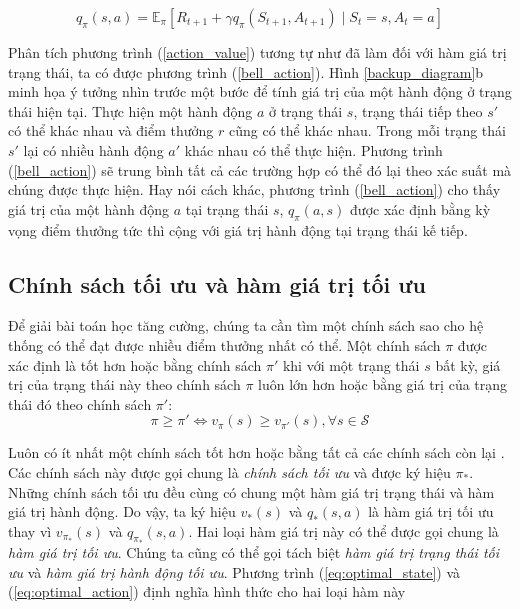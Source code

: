 \begin{equation}
\label{bell_action}
q_{\pi}(s,a) = \mathbb{E}_{\pi} \left[\mathit{R}_{t+1} + \gamma q_{\pi}(\mathit{S}_{t+1}, \mathit{A}_{t+1}) \mid \mathit{S}_t = s, \mathit{A}_t = a \right]
\end{equation}

Phân tích phương trình (\ref{action_value}) tương tự như đã làm đối với hàm giá trị trạng thái, ta có được phương trình (\ref{bell_action}).
Hình \ref{backup_diagram}b minh họa ý tưởng nhìn trước một bước để tính giá trị của một hành động ở trạng thái hiện tại. 
Thực hiện một hành động $a$ ở trạng thái $s$, trạng thái tiếp theo $s'$ có thể khác nhau và điểm thưởng $r$ cũng có thể khác nhau. 
Trong mỗi trạng thái $s'$ lại có nhiều hành động $a'$ khác nhau có thể thực hiện. 
Phương trình (\ref{bell_action}) sẽ trung bình tất cả các trường hợp có thể đó lại theo xác suất mà chúng được thực hiện. 
Hay nói cách khác, phương trình (\ref{bell_action}) cho thấy giá trị của một hành động $a$ tại trạng thái $s$, $q_{\pi}(a,s)$ được xác định bằng kỳ vọng điểm thưởng tức thì cộng với giá trị hành động tại trạng thái kế tiếp.

\subsection{Chính sách tối ưu và hàm giá trị tối ưu}
Để giải bài toán học tăng cường, chúng ta cần tìm một chính sách sao cho hệ thống có thể đạt được nhiều điểm thưởng nhất có thể. 
Một chính sách $\pi$ được xác định là tốt hơn hoặc bằng chính sách $\pi'$ khi với một trạng thái $s$ bất kỳ, giá trị của trạng thái này theo chính sách $\pi$ luôn lớn hơn hoặc bằng giá trị của trạng thái đó theo chính sách $\pi'$:
\begin{equation}
\pi \geq \pi' \Longleftrightarrow v_{\pi}(s) \geq v_{\pi'}(s), \forall s \in \mathcal{S}
\end{equation}

Luôn có ít nhất một chính sách tốt hơn hoặc bằng tất cả các chính sách còn lại \cite{sutton1998introduction}. 
Các chính sách này được gọi chung là \textit{chính sách tối ưu} và được ký hiệu $\pi_{*}$. 
Những chính sách tối ưu đều cùng có chung một hàm giá trị trạng thái và hàm giá trị hành động.
Do vậy, ta ký hiệu $v_{*}(s)$ và $q_{*}(s,a)$ là hàm giá trị tối ưu thay vì $v_{\pi_{*}}(s)$ và $q_{\pi_{*}}(s, a)$.
Hai loại hàm giá trị này có thể được gọi chung là \textit{hàm giá trị tối ưu}. 
Chúng ta cũng có thể gọi tách biệt \textit{hàm giá trị trạng thái tối ưu} và \textit{hàm giá trị hành động tối ưu}. 
Phương trình (\ref{eq:optimal_state}) và (\ref{eq:optimal_action}) định nghĩa hình thức cho hai loại hàm này

